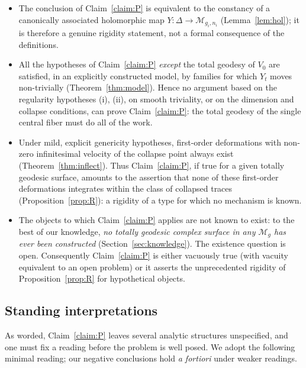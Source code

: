 \documentclass[11pt]{amsart}
\newcommand{\M}{\mathcal{M}}
\theoremstyle{plain}
\theoremstyle{definition}
\theoremstyle{remark}
\begin{document}
\begin{itemize}
\item The conclusion of Claim~\ref{claim:P} is equivalent to the constancy of a
canonically associated holomorphic map $Y:\Delta\to \M_{g_i,n_i}$
(Lemma~\ref{lem:hol}); it is therefore a genuine rigidity statement, not a formal
consequence of the definitions.
\item All the hypotheses of Claim~\ref{claim:P} \emph{except} the total geodesy of
$V_0$ are satisfied, in an explicitly constructed model, by families for which
$Y_t$ moves non-trivially (Theorem~\ref{thm:model}). Hence no argument based on the
regularity hypotheses (i), (ii), on smooth triviality, or on the dimension and
collapse conditions, can prove Claim~\ref{claim:P}: the total geodesy of the single
central fiber must do all of the work.
\item Under mild, explicit genericity hypotheses, first-order deformations with
non-zero infinitesimal velocity of the collapse point always exist
(Theorem~\ref{thm:inflect}). Thus Claim~\ref{claim:P}, if true for a given totally
geodesic surface, amounts to the assertion that none of these first-order
deformations integrates within the class of collapsed traces
(Proposition~\ref{prop:R}): a rigidity of a type for which no mechanism is known.
\item The objects to which Claim~\ref{claim:P} applies are not known to exist: to the
best of our knowledge, \emph{no totally geodesic complex surface in any $\M_g$ has
ever been constructed} (Section~\ref{sec:knowledge}). The existence question is open.
Consequently Claim~\ref{claim:P} is either vacuously true (with vacuity equivalent to
an open problem) or it asserts the unprecedented rigidity of
Proposition~\ref{prop:R} for hypothetical objects.
\end{itemize}

\subsection*{Standing interpretations}\label{subsec:standing}

As worded, Claim~\ref{claim:P} leaves several analytic structures unspecified, and
one must fix a reading before the problem is well posed. We adopt the following
minimal reading; our negative conclusions hold \emph{a fortiori} under weaker
readings.
\end{document}
